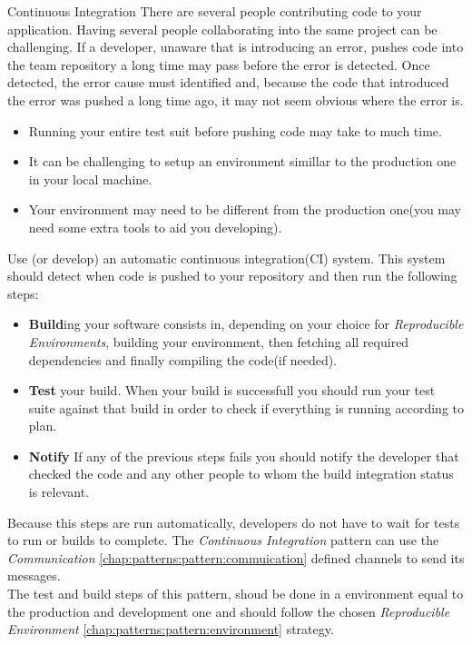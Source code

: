 \begin{pattern}{Continuous Integration} \label{chap:patterns:pattern:ci}
    \context
    There are several people contributing code to your application.
    \problem
        Having several people collaborating into the same project can be challenging. If a developer, unaware that is introducing an error, pushes code into the team repository a long time may pass before the error is detected. Once detected, the error cause must identified and, because the code that introduced the error was pushed a long time ago, it may not seem obvious where the error is.
    \forces
        \begin{itemize}
            \item Running your entire test suit before pushing code may take to much time.
            \item It can be challenging to setup an environment simillar to the production one in your local machine.
            \item Your environment may need to be different from the production one(you may need some extra tools to aid you developing).
        \end{itemize}

    \solution
        Use (or develop) an automatic continuous integration(CI) system. This system should detect when code is pushed to your repository and then run the following steps:
        \begin{itemize}
            \item \textbf{Build}ing your software consists in, depending on your choice for  \textit{Reproducible Environments}, building your environment, then fetching all required dependencies and finally compiling the code(if needed).
            \item \textbf{Test} your build. When your build is successfull you should run your test suite against that build in order to check if everything is running according to plan.
            \item \textbf{Notify} If any of the previous steps fails you should notify the developer that checked the code and any other people to whom the build integration status is relevant.
        \end{itemize}
        Because this steps are run automatically, developers do not have to wait for tests to run or builds to complete.
    \related
    The \textit{Continuous Integration} pattern can use the \textit{Communication} \ref{chap:patterns:pattern:commuication} defined channels to send its messages.\\
     The test and build steps of this pattern, shoud be done in a environment equal to the production and development one and should follow the chosen \textit{Reproducible Environment} \ref{chap:patterns:pattern:environment} strategy.
\end{pattern}






